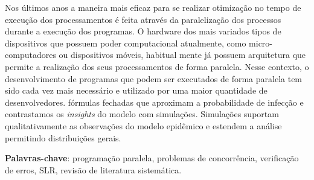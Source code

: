 
\setlength{\absparsep}{18pt} %
\begin{resumo}
Nos últimos anos a maneira mais eficaz para se realizar otimização no tempo de execução dos processamentos é feita através da paralelização dos processos durante a execução dos programas. O hardware dos mais variados tipos de dispositivos que possuem poder computacional atualmente, como micro-computadores ou dispositivos móveis, habitual mente já possuem arquitetura que permite a realização dos seus processamentos de forma paralela.
Nesse contexto, o desenvolvimento de programas que podem ser executados de forma paralela tem sido cada vez mais necessário e utilizado por uma maior quantidade de desenvolvedores. fórmulas fechadas que  aproximam a probabilidade de infecção e contrastamos os \emph{insights} do modelo com simulações. Simulações suportam qualitativamente as observações do modelo epidêmico e estendem a análise permitindo distribuições gerais.

 \textbf{Palavras-chave}: programação paralela, problemas de concorrência, verificação de erros, SLR, revisão de literatura sistemática.
\end{resumo}